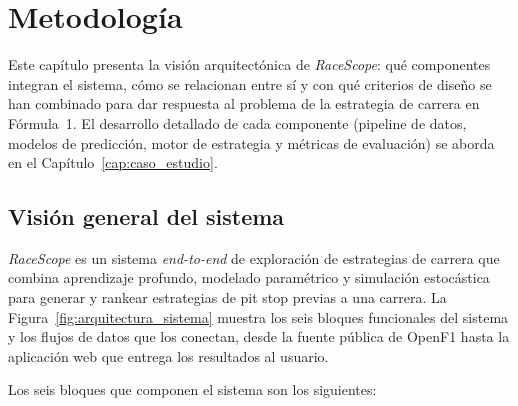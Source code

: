 
\chapter{Metodología}
\label{cap:metodologia}

Este capítulo presenta la visión arquitectónica de \textit{RaceScope}: qué componentes integran el sistema, cómo se relacionan entre sí y con qué criterios de diseño se han combinado para dar respuesta al problema de la estrategia de carrera en Fórmula~1. El desarrollo detallado de cada componente (pipeline de datos, modelos de predicción, motor de estrategia y métricas de evaluación) se aborda en el Capítulo~\ref{cap:caso_estudio}.

\section{Visión general del sistema}
\label{sec:vision_general}

\textit{RaceScope} es un sistema \textit{end-to-end} de exploración de estrategias de carrera que combina aprendizaje profundo, modelado paramétrico y simulación estocástica para generar y rankear estrategias de pit stop previas a una carrera. La Figura~\ref{fig:arquitectura_sistema} muestra los seis bloques funcionales del sistema y los flujos de datos que los conectan, desde la fuente pública de OpenF1 hasta la aplicación web que entrega los resultados al usuario.

Los seis bloques que componen el sistema son los siguientes:

